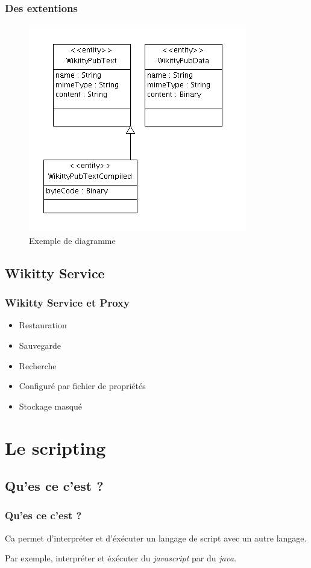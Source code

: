 \documentclass[12pt,a4paper,utf8x]{beamer}
\begin{document}
\begin{frame}\frametitle{Des extentions} 
\begin{figure}
\includegraphics[scale=0.5]{../image/wikittypubuml.png} 
\caption{Exemple de diagramme}
\end{figure}
\end{frame}


\subsection*{Wikitty Service}
\begin{frame} \frametitle{Wikitty Service et Proxy} 
\begin{itemize}
\item Restauration 
\item Sauvegarde
\item Recherche
\item Configuré par fichier de propriétés
\item Stockage masqué
\end{itemize}
\end{frame}


\section{Le scripting}
\subsection*{Qu'es ce c'est ?}
\begin{frame}\frametitle{Qu'es ce c'est ?}

Ca permet d'interpréter et d'éxécuter un langage de script avec un autre langage.


\vspace{5mm}
Par exemple, interpréter et éxécuter du \emph{javascript} par du \emph{java}.
\end{frame}
\end{document}
